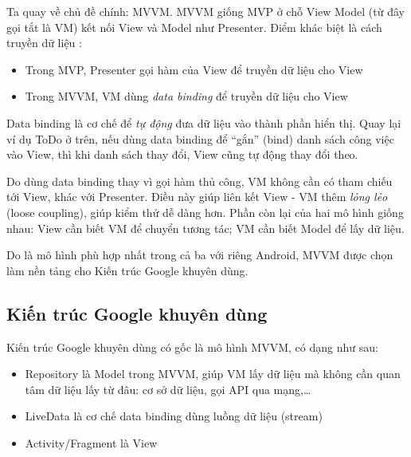 \documentclass[../../thesis]{subfiles}
\begin{document}
Ta quay về chủ đề chính: MVVM. MVVM giống MVP ở chỗ View Model (từ đây gọi tắt
là VM) kết nối View và Model như Presenter. Điểm khác biệt là cách truyền dữ
liệu \cite{MUN_MVVM}:

\begin{itemize}
    \item
          Trong MVP, Presenter gọi hàm của View để truyền dữ liệu cho View
\end{itemize}

\begin{itemize}[resume, before = \vspace*{-\dimexpr\topsep+\partopsep\relax}]
    \item
          Trong MVVM, VM dùng \emph{data binding} để truyền dữ liệu cho View
\end{itemize}

Data binding là cơ chế để \emph{tự động} đưa dữ liệu vào thành phần hiển thị.
Quay lại ví dụ ToDo ở trên, nếu dùng data binding để ``gắn'' (bind) danh sách
công việc vào View, thì khi danh sách thay đổi, View cũng tự động thay đổi theo.

Do dùng data binding thay vì gọi hàm thủ công, VM không cần có tham chiếu tới
View, khác với Presenter. Điều này giúp liên kết View - VM thêm \emph{lỏng lẻo}
(loose coupling), giúp kiểm thử dễ dàng hơn. Phần còn lại của hai mô hình giống
nhau: View cần biết VM để chuyển tương tác; VM cần biết Model để lấy dữ liệu.

Do là mô hình phù hợp nhất trong cả ba với riêng Android, MVVM được chọn làm nền
tảng cho Kiến trúc Google khuyên dùng.

\subsection{Kiến trúc Google khuyên dùng}

Kiến trúc Google khuyên dùng có gốc là mô hình MVVM, có dạng như sau:

\begin{itemize}
    \item
        Repository là Model trong MVVM, giúp VM lấy dữ liệu mà không cần quan
        tâm dữ liệu lấy từ đâu: cơ sở dữ liệu, gọi API qua mạng,\ldots
    \item
        LiveData là cơ chế data binding dùng luồng dữ liệu (stream)
    \item
        Activity/Fragment là View
\end{itemize}
\end{document}
